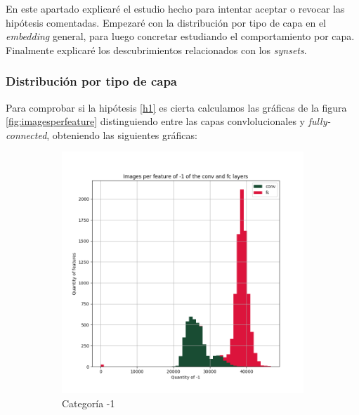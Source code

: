 \documentclass[12,twoside]{TFG-GM}
\theoremstyle{definition}
\theoremstyle{remark}
\begin{document}
En este apartado explicaré el estudio hecho para intentar aceptar o revocar las hipótesis comentadas. Empezaré con la distribución por tipo de capa en el \textit{embedding} general, para luego concretar estudiando el comportamiento por capa. Finalmente explicaré los descubrimientos relacionados con los \textit{synsets}. 
\subsubsection{Distribución por tipo de capa}
Para comprobar si la hipótesis \ref{h1} es cierta calculamos las gráficas de la figura \ref{fig:imagesperfeature} distinguiendo entre las capas convlolucionales y \textit{fully-connected}, obteniendo las siguientes gráficas: 

\begin{figure}[ht] 
	\centering
	\begin{subfigure}[b]{0.3\textwidth}
		\includegraphics[width=\textwidth] {Images/plots/25/Images_per_feature_of_-1_category_all_layers.png}
		\caption{Categoría -1}
	\end{subfigure}
	\begin{subfigure}[b]{0.3\textwidth}

\end{subfigure}
\end{figure}
\end{document}
